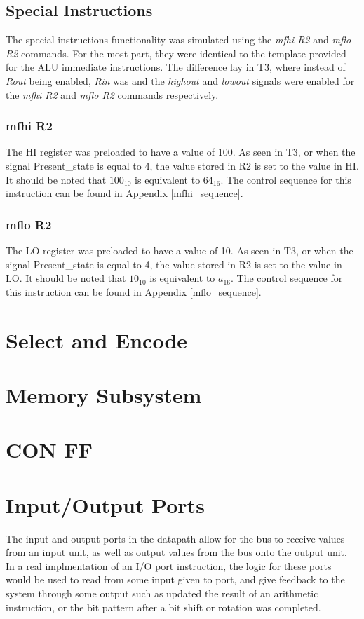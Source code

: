 \documentclass{article}
\begin{document}
    \subsection{Special Instructions}
    The special instructions functionality was simulated using the \emph{mfhi R2} and \emph{mflo R2} commands. For the most part, they were identical to the template provided for the ALU immediate instructions. The difference lay in T3, where instead of \emph{Rout} being enabled, \emph{Rin} was and the \emph{highout} and \emph{lowout} signals were enabled for the \emph{mfhi R2} and \emph{mflo R2} commands respectively. 
    
        \subsubsection{mfhi R2}
            The HI register was preloaded to have a value of 100. As seen in T3, or when the signal Present\_state is equal to 4, the value stored in R2 is set to the value in HI. It should be noted that $100_{10}$ is equivalent to $64_{16}$. The control sequence for this instruction can be found in Appendix \ref{mfhi_sequence}.
        \subsubsection{mflo R2}
            The LO register was preloaded to have a value of 10. As seen in T3, or when the signal Present\_state is equal to 4, the value stored in R2 is set to the value in LO. It should be noted that $10_{10}$ is equivalent to $a_{16}$. The control sequence for this instruction can be found in Appendix \ref{mflo_sequence}.
\appendix
\section{Select and Encode}
\section{Memory Subsystem}
\section{CON FF}
\section{Input/Output Ports}
The input and output ports in the datapath allow for the bus to receive values from an input unit, as well as output values from the bus onto the output unit. In a real implmentation of an I/O port instruction, the logic for these ports would be used to read from some input given to port, and give feedback to the system through some output such as updated the result of an arithmetic instruction, or the bit pattern after a bit shift or rotation was completed.
\end{document}

